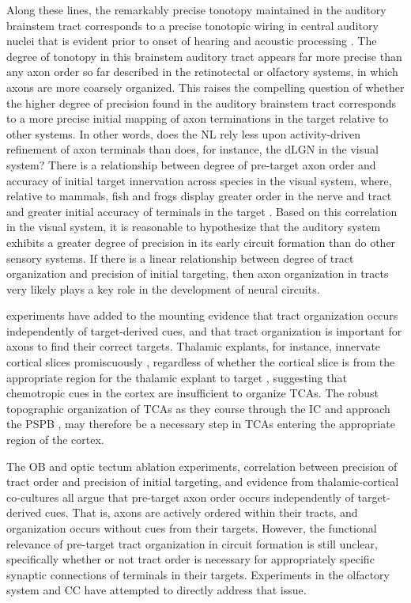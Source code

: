 Along these lines, the remarkably precise tonotopy maintained in the auditory brainstem tract \cite{kashima2013pre} corresponds to a precise tonotopic wiring in central auditory nuclei that is evident prior to onset of hearing and acoustic processing \cite{appler2011connecting}.
The degree of tonotopy in this brainstem auditory tract appears far more precise than any axon order so far described in the retinotectal or olfactory systems, in which axons are more coarsely organized.
This raises the compelling question of whether the higher degree of precision found in the auditory brainstem tract corresponds to a more precise initial mapping of axon terminations in the target relative to other systems.
In other words, does the NL rely less upon activity-driven refinement of axon terminals than does, for instance, the dLGN in the visual system? 
There is a relationship between degree of pre-target axon order and accuracy of initial target innervation across species in the visual system, where, relative to mammals, fish and frogs display greater order in the nerve and tract and greater initial accuracy of terminals in the target \cite{simon1991relationship}.
Based on this correlation in the visual system, it is reasonable to hypothesize that the auditory system exhibits a greater degree of precision in its early circuit formation than do other sensory systems.
If there is a linear relationship between degree of tract organization and precision of initial targeting, then axon organization in tracts very likely plays a key role in the development of neural circuits.

\Invitro{} experiments have added to the mounting evidence that tract organization occurs independently of target-derived cues, and that tract organization is important for axons to find their correct targets.
Thalamic explants, for instance, innervate cortical slices promiscuously \invitro{}, regardless of whether the cortical slice is from the appropriate region for the thalamic explant to target \cite{molnar1991lack}, suggesting that chemotropic cues in the cortex are insufficient to organize TCAs.
The robust topographic organization of TCAs as they course through the IC and approach the PSPB \cite{molnar1998mechanisms}, may therefore be a necessary step in TCAs entering the appropriate region of the cortex. 

The OB and optic tectum ablation experiments, correlation between precision of tract order and precision of initial targeting, and \invitro{} evidence from thalamic-cortical co-cultures all argue that pre-target axon order occurs independently of target-derived cues.
That is, axons are actively ordered within their tracts, and organization occurs without cues from their targets.
However, the functional relevance of pre-target tract organization in circuit formation is still unclear, specifically whether or not tract order is necessary for appropriately specific synaptic connections of terminals in their targets.
Experiments in the olfactory system and CC have attempted to directly address that issue.

